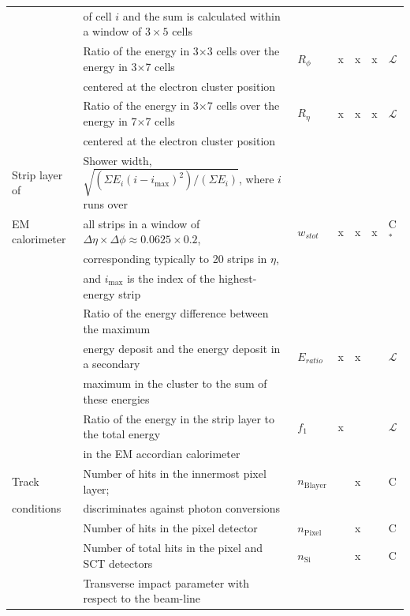 \begin{table}
\begin{adjustwidth}{-1in}{-1in}
\begin{center}
\begin{tabular}{|l|l|l|c|c|c|l|}
& of cell $i$ and the sum is calculated within a window of $3\times5$ cells & & & & & \\
\cline{2-7}
& Ratio of the energy in 3$\times$3 cells over the energy in 3$\times$7 cells & $R_{\phi}$ & x & x & x & $\mathcal{L}$  \\
& centered at the electron cluster position & & & & & \\
\cline{2-7}
& Ratio of the energy in 3$\times$7 cells over the energy in 7$\times$7 cells  & $R_{\eta}$ & x & x & x & $\mathcal{L}$  \\
& centered at the electron cluster position & & & & & \\
\hline
Strip layer of       & Shower width, $\sqrt{(\Sigma E_i (i-i_\mathrm{max})^2)/(\Sigma E_i)}$, where $i$ runs over  &   & & & & \\ 
EM calorimeter       & all strips in a window of $\Delta\eta \times \Delta\phi \approx 0.0625 \times 0.2$,  & $w_{stot}$ & x & x & x & C$^{*}$ \\
                     & corresponding typically to 20 strips in $\eta$, & & & & &                  \\
                     & and $i_\mathrm{max}$ is the index of the highest-energy strip        &  & & & &   \\
\cline{2-7}
                     & Ratio of the energy difference between the maximum &    & & & &  \\
                     & energy deposit and the energy deposit in a secondary & $E_{ratio}$ & x & x & & $\mathcal{L}$  \\
                   & maximum in the cluster to the sum of these energies & & & & &   \\
\cline{2-7}     
& Ratio of the energy in the strip layer to the total energy  & $f_1$ & x & & & $\mathcal{L}$  \\
	& in the EM accordian calorimeter &  & & & & \\
\hline
Track  & Number of hits in the innermost pixel layer;&   $n_\mathrm{Blayer}$ & & x & & C \\
conditions & discriminates against photon conversions &   $ $  & & & & \\
	\cline{2-7}
	                     & Number of hits in the pixel detector        &    $n_\mathrm{Pixel}$ & & x & & C \\
	\cline{2-7}
                     & Number of total hits in the pixel and SCT   detectors  &   $n_{\mathrm{Si}}$  & & x & & C \\
	\cline{2-7}
                     & Transverse impact parameter with respect to the beam-line

\end{tabular}
\end{center}
\end{adjustwidth}
\end{table}
